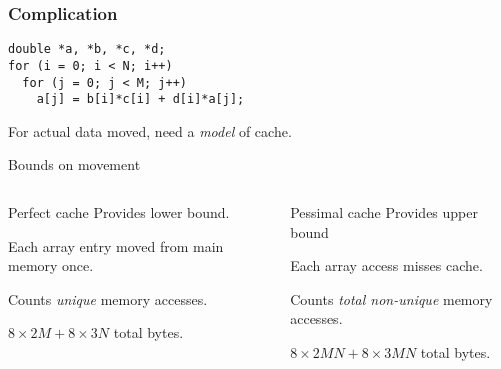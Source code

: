 \documentclass[presentation,aspectratio=43,10pt]{beamer}
\begin{document}
\begin{frame}[fragile]
  \frametitle{Complication}
\begin{verbatim}
double *a, *b, *c, *d;
for (i = 0; i < N; i++)
  for (j = 0; j < M; j++)
    a[j] = b[i]*c[i] + d[i]*a[j];
\end{verbatim}
  For actual data moved, need a \emph{model} of cache.
  \begin{answer}{Bounds on movement}
    \vspace{0.5\baselineskip}
    \begin{columns}[t]
      \begin{column}{0.45\textwidth}
        \begin{exampleblock}{Perfect cache}
          Provides lower bound.

          Each array entry moved from main memory once.

          Counts \emph{unique} memory accesses.

          $8\times 2M + 8\times 3N$ total bytes.
        \end{exampleblock}
      \end{column}
      \begin{column}{0.45\textwidth}
        \begin{challenge}{Pessimal cache}
          Provides upper bound

          Each array access misses cache.

          Counts \emph{total non-unique} memory accesses.

          $8 \times 2MN + 8\times 3MN$ total bytes.
        \end{challenge}
      \end{column}
    \end{columns}
  \end{answer}
\end{frame}
\end{document}
